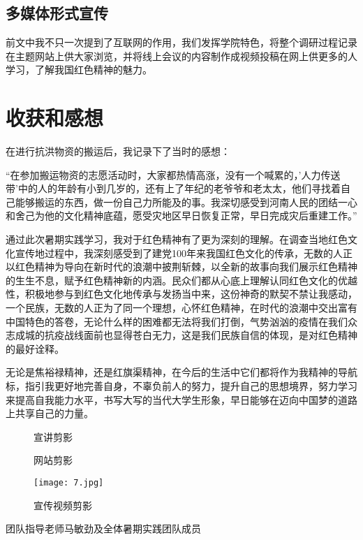 \documentclass[AutoFakeBold]{LZUThesis}
\begin{document}
\section{多媒体形式宣传}
前文中我不只一次提到了互联网的作用，我们发挥学院特色，将整个调研过程记录在主题网站上供大家浏览，并将线上会议的内容制作成视频投稿在网上供更多的人学习，了解我国红色精神的魅力。

\chapter{收获和感想}
在进行抗洪物资的搬运后，我记录下了当时的感想：

“在参加搬运物资的志愿活动时，大家都热情高涨，没有一个喊累的，'人力传送带'中的人的年龄有小到几岁的，还有上了年纪的老爷爷和老太太，他们寻找着自己能够搬运的东西，做一份自己力所能及的事。我深切感受到河南人民的团结一心和舍己为他的文化精神底蕴，愿受灾地区早日恢复正常，早日完成灾后重建工作。”

通过此次暑期实践学习，我对于红色精神有了更为深刻的理解。在调查当地红色文化宣传地过程中，我深刻感受到了建党100年来我国红色文化的传承，无数的人正以红色精神为导向在新时代的浪潮中披荆斩棘，以全新的故事向我们展示红色精神的生生不息，赋予红色精神新的内涵。民众们都从心底上理解认同红色文化的优越性，积极地参与到红色文化地传承与发扬当中来，这份神奇的默契不禁让我感动，一个民族，无数的人正为了同一个理想，心怀红色精神，在时代的浪潮中交出富有中国特色的答卷，无论什么样的困难都无法将我们打倒，气势汹汹的疫情在我们众志成城的抗疫战线面前也显得苍白无力，这是我们民族自信的体现，是对红色精神的最好诠释。

无论是焦裕禄精神，还是红旗渠精神，在今后的生活中它们都将作为我精神的导航标，指引我更好地完善自身，不辜负前人的努力，提升自己的思想境界，努力学习来提高自我能力水平，书写大写的当代大学生形象，早日能够在迈向中国梦的道路上共享自己的力量。
\backmatter
\printbib
\Appendix
\begin{figure}[htbp]
    \centering
    \quad
    \quad
    \quad
    \caption{宣讲剪影}
\end{figure}
\begin{figure}[htbp]
    \centering
    \quad
    \caption{网站剪影}
\end{figure}
\begin{figure}[htbp]
    \centering
    \texttt{[image: 7.jpg]}
    \caption{宣传视频剪影}
\end{figure}

\Thanks
团队指导老师马敏劲及全体暑期实践团队成员
\end{document}
